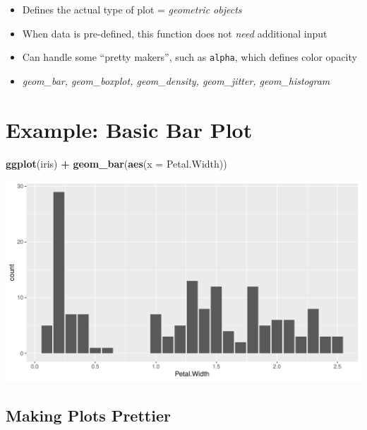 \documentclass[
]{book}
\newenvironment{Shaded}{\begin{snugshade}}{\end{snugshade}}
\newcommand{\AttributeTok}[1]{\textcolor[rgb]{0.13,0.29,0.53}{#1}}
\newcommand{\FunctionTok}[1]{\textcolor[rgb]{0.13,0.29,0.53}{\textbf{#1}}}
\newcommand{\NormalTok}[1]{#1}
\newcommand{\SpecialCharTok}[1]{\textcolor[rgb]{0.81,0.36,0.00}{\textbf{#1}}}
\providecommand{\tightlist}{%
  \setlength{\itemsep}{0pt}\setlength{\parskip}{0pt}}
\begin{document}
\begin{itemize}
\tightlist
\item
  Defines the actual type of plot = \emph{geometric objects}
\item
  When data is pre-defined, this function does not \emph{need} additional input
\item
  Can handle some ``pretty makers'', such as \texttt{alpha}, which defines color opacity
\item
  \emph{geom\_bar, geom\_boxplot, geom\_density, geom\_jitter, geom\_histogram}
\end{itemize}

\section{Example: Basic Bar Plot}\label{example-basic-bar-plot}

\begin{Shaded}
\begin{Highlighting}[]
\FunctionTok{ggplot}\NormalTok{(iris) }\SpecialCharTok{+} 
  \FunctionTok{geom\_bar}\NormalTok{(}\FunctionTok{aes}\NormalTok{(}\AttributeTok{x =}\NormalTok{ Petal.Width)) }
\end{Highlighting}
\end{Shaded}

\begin{flushleft}\includegraphics{_main_files/figure-latex/unnamed-chunk-44-1} \end{flushleft}

\subsection{Making Plots Prettier}\label{making-plots-prettier}
\end{document}
